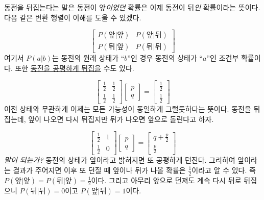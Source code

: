 \documentclass[a4paper,chapter,atbegshi,]{oblivoir}
\begin{document}
동전을 뒤집는다는 말은 동전이 앞\emph{이었던} 확률은 이제 동전이 뒤\emph{인}
확률이라는 뜻이다. 다음 같은 변환 행렬이 이해를 도울 수 있겠다.

\begin{equation}
  \begin{bmatrix}
    P(\textrm{앞}|\textrm{앞}) &P(\textrm{앞}|\textrm{뒤}) \\
    P(\textrm{뒤}|\textrm{앞}) &P(\textrm{뒤}|\textrm{뒤})
  \end{bmatrix}
\end{equation}
여기서 $P(a|b)$는 동전의 원래 상태가 ``$b$''인 경우 동전의 상태가 ``$a$''인 조건부 확률이다. 또한 \underline{동전을 공평하게 뒤집을} 수도 있다.

\begin{equation}
  \begin{bmatrix}
    \frac{1}{2} & \frac{1}{2} \\
    \frac{1}{2} & \frac{1}{2}
  \end{bmatrix}
  \begin{bmatrix}p\\q\end{bmatrix} =
  \begin{bmatrix}\frac{1}{2}\\\frac{1}{2}\end{bmatrix}
\end{equation}
이전 상태와 무관하게 이제는 모든 가능성이 동일하게 그럴듯하다는 뜻이다. 
동전을 뒤집는데, 앞이 나오면 다시 뒤집지만 뒤가 나오면
앞으로 돌린다고 하자.

\begin{equation}
  \begin{bmatrix}
    \frac{1}{2} & 1 \\ \frac{1}{2} & 0
  \end{bmatrix}
  \begin{bmatrix} p \\ q \end{bmatrix} = 
  \begin{bmatrix} q+\frac{p}{2} \\ \frac{p}{2} \end{bmatrix}
\end{equation}
\emph{말이 되는가?} 동전의 상태가 앞이라고 밝혀지면 또 공평하게 던진다.
그리하여 앞이라는 결과가 주어지면 이후 또 던질 때 앞이나 뒤가 나올 확률은
$\frac{1}{2}$이라고 알 수 있다. 즉 $P(\textrm{앞}|\textrm{앞})= P(\textrm{뒤}|
\textrm{앞})=\frac{1}{2}$이다. 그리고 아무리 앞으로 던져도 계속 다시 뒤로
뒤집으니 $P(\textrm{뒤}|\textrm{뒤})=0$이고
$P(\textrm{앞}|\textrm{뒤})=1$이다. 
\end{document}
